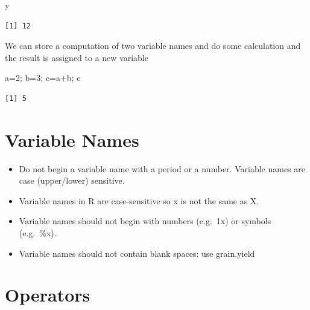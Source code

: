 \documentclass[
  letterpaper,
  DIV=11,
  numbers=noendperiod]{scrreprt}
\newenvironment{Shaded}{\begin{snugshade}}{\end{snugshade}}
\newcommand{\CommentTok}[1]{\textcolor[rgb]{0.37,0.37,0.37}{#1}}
\newcommand{\DecValTok}[1]{\textcolor[rgb]{0.68,0.00,0.00}{#1}}
\newcommand{\NormalTok}[1]{\textcolor[rgb]{0.00,0.23,0.31}{#1}}
\newcommand{\OtherTok}[1]{\textcolor[rgb]{0.00,0.23,0.31}{#1}}
\newcommand{\SpecialCharTok}[1]{\textcolor[rgb]{0.37,0.37,0.37}{#1}}
\begin{document}
\begin{Shaded}
\begin{Highlighting}[]
\NormalTok{y}
\end{Highlighting}
\end{Shaded}

\begin{verbatim}
[1] 12
\end{verbatim}

We can store a computation of two variable names and do some calculation
and the result is assigned to a new variable

\begin{Shaded}
\begin{Highlighting}[]
\NormalTok{a}\OtherTok{=}\DecValTok{2}\NormalTok{;}
\NormalTok{b}\OtherTok{=}\DecValTok{3}\NormalTok{;}
\NormalTok{c}\OtherTok{=}\NormalTok{a}\SpecialCharTok{+}\NormalTok{b;}
\NormalTok{c}
\end{Highlighting}
\end{Shaded}

\begin{verbatim}
[1] 5
\end{verbatim}

\hypertarget{variable-names}{%
\section{Variable Names}\label{variable-names}}

\begin{itemize}
\item
  Do not begin a variable name with a period or a number. Variable names
  are case (upper/lower) sensitive.
\item
  Variable names in R are case-sensitive so x is not the same as X.
\item
  Variable names should not begin with numbers (e.g.~1x) or symbols
  (e.g.~\%x).
\item
  Variable names should not contain blank spaces: use grain.yield
\end{itemize}

\hypertarget{operators}{%
\section{Operators}\label{operators}}

\begin{Shaded}
\end{Shaded}
\end{document}
